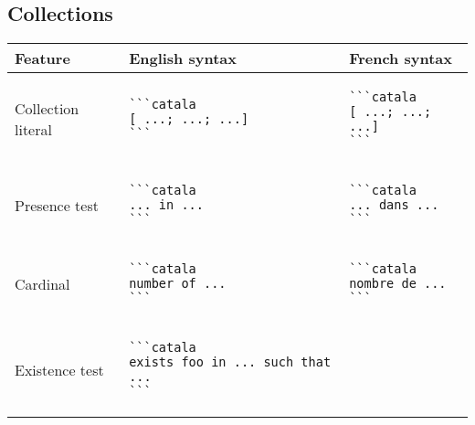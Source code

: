 \documentclass[a3paper,landscape]{article}
\begin{document}
\begin{multicols*}{2}
\section*{Collections}
\begin{center}
\begin{tabular}{p{}p{}p{}}
\toprule
Feature&English syntax&French syntax\\\midrule
Collection literal&
\vspace*{-1.75em}
\begin{verbatim}
```catala
[ ...; ...; ...]
```
\end{verbatim}
\vspace*{-1.75em}
&
\vspace*{-1.75em}
\begin{verbatim}
```catala
[ ...; ...; ...]
```
\end{verbatim}
\vspace*{-1.75em}
\\
Presence test&
\vspace*{-1.75em}
\begin{verbatim}
```catala
... in ...
```
\end{verbatim}
\vspace*{-1.75em}
&
\vspace*{-1.75em}
\begin{verbatim}
```catala
... dans ...
```
\end{verbatim}
\vspace*{-1.75em}
\\
Cardinal&
\vspace*{-1.75em}
\begin{verbatim}
```catala
number of ...
```
\end{verbatim}
\vspace*{-1.75em}
&
\vspace*{-1.75em}
\begin{verbatim}
```catala
nombre de ...
```
\end{verbatim}
\vspace*{-1.75em}
\\
Existence test&
\vspace*{-1.75em}
\begin{verbatim}
```catala
exists foo in ... such that ...
```
\end{verbatim}
\vspace*{-1.75em}
&
\vspace*{-1.75em}
\begin{verbatim}

\end{verbatim}
\end{tabular}
\end{center}
\end{multicols*}
\end{document}
